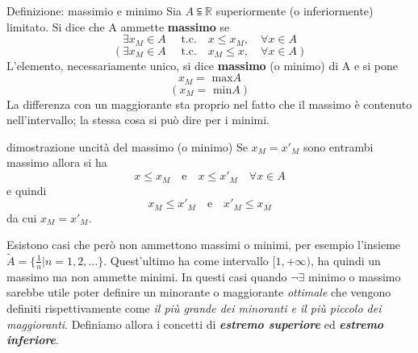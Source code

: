 \documentclass[x11names]{article}
\begin{document}
	
	\begin{center}
		\colorbox{myblue}{\begin{minipage}{5.75in}
				\begin{blues}{Definizione: massimio e minimo}
					Sia $A \subseteqq \mathbb{R}$ superiormente (o inferiormente) limitato.
					Si dice che A ammette \textbf{massimo} se
					\[
					\exists x_M \in A \quad \text{ t.c.} \quad x \leq x_M, \quad \forall x \in A
					\]
					\[
					\left(\exists x_M \in A \quad \text{ t.c.} \quad x_M \leq x, \quad \forall x \in A\right)
					\]
					L'elemento, necessariamente unico, si dice \textbf{massimo} (o minimo)  di A e si pone 
					\[
					x_M = \text{ max}A 
					\]
					\[
					\left(x_M = \text{ min}A \right)
					\]
					La differenza con un maggiorante sta proprio nel fatto che il massimo è contenuto nell'intervallo; la stessa cosa si può dire per i minimi. 
				\end{blues}
		\end{minipage}}       
	\end{center}
	\begin{es}{dimostrazione uncità del massimo (o minimo)}
		Se $x_M = x'_M$ sono entrambi massimo allora si ha
		\[
		x \leq x_M \quad \text{e} \quad x \leq x'_M \quad \forall x \in A
		\]
		e quindi
		\[
		x_M \leq x'_M \quad \text{e} \quad x'_M \leq x_M
		\]
		da cui $x_M = x'_M$.
	\end{es}
	
	Esistono casi che però non ammettono massimi o minimi, per esempio l'insieme $\tilde{A} = \{ \frac{1}{n} | n = 1,2,\dots \}$. Quest'ultimo ha come intervallo $[1,+\infty)$, ha quindi un massimo ma non ammette minimi. In questi casi quando $\neg \exists$ minimo o massimo sarebbe utile poter definire un minorante o maggiorante \textit{ottimale} che vengono definiti rispettivamente come \textit{il più grande dei minoranti e il più piccolo dei maggioranti}. Definiamo allora i concetti di \textit{\textbf{estremo superiore}} ed \textit{\textbf{estremo inferiore}}.
	
\end{document}
